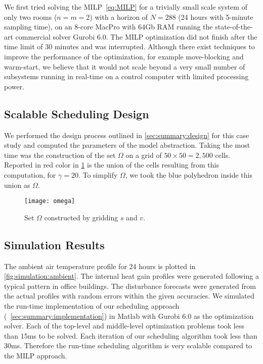 We first tried solving the MILP~\eqref{eq:MILP} for a trivially small scale system of only two rooms ($n=m=2$) with a horizon of $N=288$ (24 hours with 5-minute sampling time), on an 8-core MacPro with 64Gb RAM running the state-of-the-art commercial solver Gurobi 6.0.
The MILP optimization did not finish after the time limit of 30 minutes and was interrupted.
Although there exist techniques to improve the performance of the optimization, for example move-blocking and warm-start, we believe that it would not scale beyond a very small number of subsystems running in real-time on a control computer with limited processing power.

\subsection{Scalable Scheduling Design}
\label{sec:simulation:design}

We performed the design process outlined in \cref{sec:summary:design} for this case study and computed the parameters of the model abstraction.
Taking the most time was the construction of the set $\Omega$ on a grid of $50 \times 50 = 2\comma 500$ cells.
Reported in red color in \cref{fig:simulation:omega} is the union of the cells resulting from this computation, for $\gamma = 20$.
To simplify $\Omega$, we took the blue polyhedron inside this union as $\Omega$.

\begin{figure}[tb]
  \centering
  \texttt{[image: omega]}
  \caption{Set $\Omega$ constructed by gridding $s$ and $v$.}
    \vspace{-10pt}
  \label{fig:simulation:omega}
\end{figure}


\subsection{Simulation Results}
\label{sec:simulation:results}

The ambient air temperature profile for 24 hours is plotted in \cref{fig:simulation:ambient}.
The internal heat gain profiles were generated following a typical pattern in office buildings.
The disturbance forecasts were generated from the actual profiles with random errors within the given accuracies.
We simulated the run-time implementation of our scheduling approach (~\cref{sec:summary:implementation}) in Matlab with Gurobi 6.0 as the optimization solver.
Each of the top-level and middle-level optimization problems took less than 15ms to be solved.
Each iteration of our scheduling algorithm took less than 30ms.
Therefore the run-time scheduling algorithm is very scalable compared to the MILP approach.

